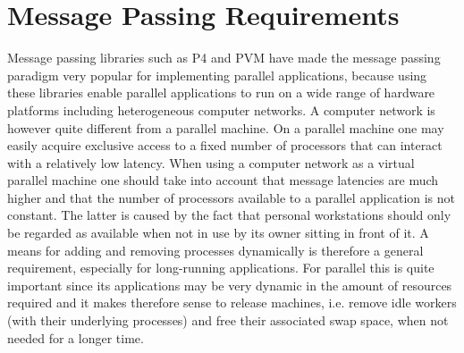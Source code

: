 %
% 
% 
% 
% 
\section{\eclipse Message Passing Requirements}
\label{sec:eclipse}

Message passing libraries such as P4 \cite{p4:parcom4_94} and PVM 
\cite{pvm:parcom4_94} have made the message passing paradigm very
popular for implementing parallel applications, because using 
these libraries enable parallel applications to run on a wide range 
of hardware platforms including heterogeneous computer networks. A 
computer network is however quite different from a parallel machine. 
On a parallel machine one may easily acquire exclusive access to a 
fixed number of processors that can interact with a relatively low 
latency. When using a computer network as a virtual parallel machine
one should take into account that message latencies are much higher
and that the number of processors available to a parallel application
is not constant. The latter is caused by the fact that personal
workstations should only be regarded as available when not in use by 
its owner sitting in front of it. A means for adding and removing 
processes dynamically is therefore a general requirement, especially
for long-running applications. For parallel \eclipse this is quite
important since its applications may be very dynamic in the amount
of resources required and it makes therefore sense to release machines, 
i.e. remove idle workers (with their underlying processes) and free 
their associated swap space, when not needed for a longer time.

